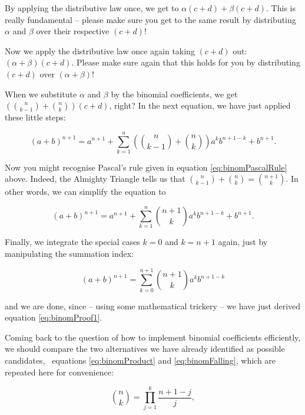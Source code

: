 \documentclass{scrreprt}
\begin{document}
By applying the distributive law once,
we get to
$\alpha (c + d) + \beta (c + d)$.
This is really fundamental -- 
please make sure you get to the same result
by distributing $\alpha$ and $\beta$
over their respective $(c + d)$!

Now we apply the distributive law once again
taking $(c + d)$ out:
$(\alpha + \beta) (c + d)$.
Please make sure again that this holds for you
by distributing $(c + d)$ over $(\alpha + \beta)$!

When we substitute $\alpha$ and $\beta$
by the binomial coefficients,
we get $(\binom{n}{k-1} + \binom{n}{k}) (c + d)$,
right?
In the next equation, we have just applied these little
steps:

\begin{equation}
  (a + b)^{n + 1} = a^{n+1} + 
                    \sum_{k=1}^{n}{\left(\binom{n}{k-1} + \binom{n}{k}\right)a^{k}b^{n+1-k}} +
                    b^{n+1}.
\end{equation}

Now you might recognise Pascal's rule 
given in equation \ref{eq:binomPascalRule} above.
Indeed, the Almighty Triangle tells us
that $\binom{n}{k-1} + \binom{n}{k} = \binom{n+1}{k}$.
In other words, 
we can simplify the equation to

\begin{equation}
  (a + b)^{n + 1} = a^{n+1} + 
                    \sum_{k=1}^{n}{\binom{n+1}{k}a^{k}b^{n+1-k}} +
                    b^{n+1}.
\end{equation}

Finally, we integrate the special cases $k=0$ and $k=n+1$ again,
just by manipulating the summation index:

\begin{equation}
  (a + b)^{n + 1} = \sum_{k=0}^{n+1}{\binom{n+1}{k}a^{k}b^{n+1-k}} 
\end{equation}

and we are done, since 
-- using some mathematical trickery --
we have just derived
equation \ref{eq:binomProof1}.

Coming back to the question of how to implement
binomial coefficients efficiently,
we should compare the two alternatives
we have already identified as possible candidates,
\viz\ equations \ref{eq:binomProduct} and 
\ref{eq:binomFalling},
which are repeated here for convenience:

\begin{equation}
\binom{n}{k} = 
\prod_{j=1}^{k}{\frac{n + 1 - j}{j}},
\end{equation}
\end{document}

